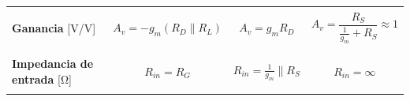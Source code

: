 \documentclass[10pt]{article}
\begin{document}
\begin{table}
\begin{tabular}{|p{3cm}|c|c|c|}
		                                           &                                                                                                                                                                                                      &                                       &                                                    \\
		\hline
		                                           &                                                                                                                                                                                                      &                                       &                                                    \\
		\textbf{Ganancia} [\si{\volt/\volt}]       & $A_v = -g_m(R_D\parallel R_L)$                                                                                                                                                                       & $A_v = g_mR_D$                        & $A_v = \dfrac{R_S}{\frac{1}{g_m} + R_S} \approx 1$ \\
		                                           &                                                                                                                                                                                                      &                                       &                                                    \\
		\hline
		                                           &                                                                                                                                                                                                      &                                       &                                                    \\
		\textbf{Impedancia de entrada} [\si{\ohm}] & $R_{in} = R_G$                                                                                                                                                                                       & $R_{in} = \frac{1}{g_m}\parallel R_S$ & $R_{in} = \infty$                                  \\
		                                           &                                                                                                                                                                                                      &                                       &                                                    \\

\end{tabular}
\end{table}
\end{document}
